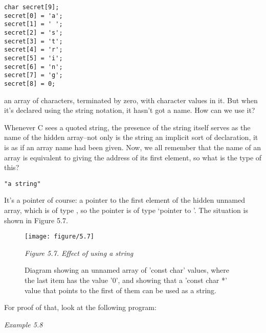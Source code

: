    \begin{Verbatim}
char secret[9];
secret[0] = 'a';
secret[1] = ' ';
secret[2] = 's';
secret[3] = 't';
secret[4] = 'r';
secret[5] = 'i';
secret[6] = 'n';
secret[7] = 'g';
secret[8] = 0;
\end{Verbatim}

   an array of characters, terminated by zero, with character values in
    it. But when it's declared using the string notation, it hasn't got
    a name. How can we use it?


   Whenever C sees a quoted string, the presence of the string itself
    serves as the name of the hidden array--not only is the string an
    implicit sort of declaration, it is as if an array name had been given.
    Now, we all remember that the name of an array is equivalent to giving
    the address of its first element, so what is the type of this?


   \begin{Verbatim}
"a string"
\end{Verbatim}

   It's a pointer of course: a pointer to the first element of the hidden
    unnamed array, which is of type \kchar, so the pointer is of
    type `pointer to \kchar'. The situation is shown in
    Figure 5.7.


    \begin{figure*}[htb]\centering
      \texttt{[image: figure/5.7]}
      \caption{Diagram showing an unnamed array of 'const char' values, where the            last item has the value '0', and showing that a 'const char *'            value that points to the first of them can be used as a string.}
    \begin{center}\textit{Figure 5.7. Effect of using a string}\end{center}
    \end{figure*}



   For proof of that, look at the following program:


   \begin{center}\textit{Example 5.8}\end{center}


